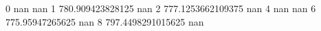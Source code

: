 0 nan nan
1 780.909423828125 nan
2 777.1253662109375 nan
4 nan nan
6 775.95947265625 nan
8 797.4498291015625 nan
